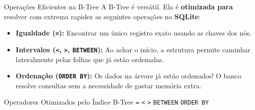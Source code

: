 \documentclass[9pt]{beamer}
\begin{document}
\begin{frame}[fragile]{Operações Eficientes na B-Tree}
    A B-Tree é versátil. Ela é \textbf{otimizada para} resolver com extrema rapidez as seguintes operações no \textbf{SQLite}:
    
    \vspace{0.3cm}
    \begin{itemize}
        \item \textbf{Igualdade (\texttt{=}):} Encontrar um único registro exato usando as chaves dos nós.
        \item \textbf{Intervalos (\texttt{<}, \texttt{>}, \texttt{BETWEEN}):} Ao achar o início, a estrutura permite caminhar lateralmente pelas folhas que já estão ordenadas.
        \item \textbf{Ordenação (\texttt{ORDER BY}):} Os dados na árvore já estão ordenados! O banco resolve consultas sem a necessidade de gastar memória extra.
    \end{itemize}
    
    \vspace{0.3cm}
    \begin{alertblock}{Operadores Otimizados pelo Índice B-Tree}
        \centering
        \Large \texttt{=} \qquad \texttt{<} \qquad \texttt{>} \qquad \texttt{BETWEEN} \qquad \texttt{ORDER BY}
    \end{alertblock}
\end{frame}
\end{document}
